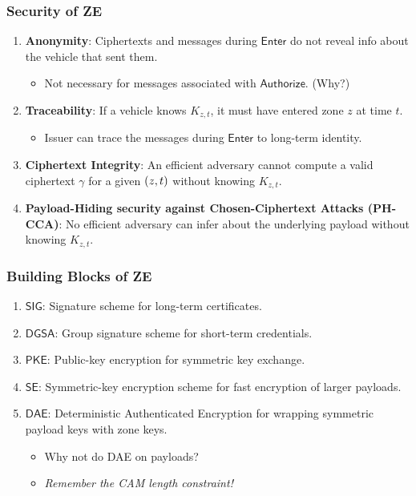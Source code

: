 \documentclass{beamer}
\begin{document}
    \begin{frame}
        \frametitle{Security of ZE}
        \begin{enumerate}
            \item \textbf{Anonymity}: Ciphertexts and messages during
            \(\mathsf{Enter}\) do not reveal info about the vehicle that sent
            them.
            \begin{itemize}
                \item Not necessary for messages associated with
                \(\mathsf{Authorize}\). (Why?)
            \end{itemize}
            \item<2-> \textbf{Traceability}: If a vehicle knows \(K_{z,t}\), it
            must have entered zone \(z\) at time \(t\).
            \begin{itemize}
                \item Issuer can trace the messages during \(\mathsf{Enter}\) to
                long-term identity.
            \end{itemize}
            \item<3-> \textbf{Ciphertext Integrity}: An efficient adversary
            cannot compute a valid ciphertext \(\gamma\) for a given
            \(\left(z,t\right)\) without knowing \(K_{z,t}\).
            \item<4-> \textbf{Payload-Hiding security against Chosen-Ciphertext
            Attacks (PH-CCA)}: No efficient adversary can infer about the
            underlying payload without knowing \(K_{z,t}\). 
        \end{enumerate}
    \end{frame}

    \begin{frame}
        \frametitle{Building Blocks of ZE}    
        \begin{enumerate}
            \item<1-> \(\mathsf{SIG}\): Signature scheme for long-term
            certificates.
            \item<2-> \(\mathsf{DGSA}\): Group signature scheme for short-term
            credentials.
            \item<3-> \(\mathsf{PKE}\): Public-key encryption for symmetric key
            exchange.
            \item<4-> \(\mathsf{SE}\): Symmetric-key encryption scheme for fast
            encryption of larger payloads.
            \item<5-> \(\mathsf{DAE}\): Deterministic Authenticated Encryption
            for wrapping symmetric payload keys with zone keys.
            \begin{itemize}
                \item Why not do DAE on payloads?
                \item<6-> \emph{Remember the CAM length constraint!}
            \end{itemize} 
        \end{enumerate}
    \end{frame}
\end{document}
